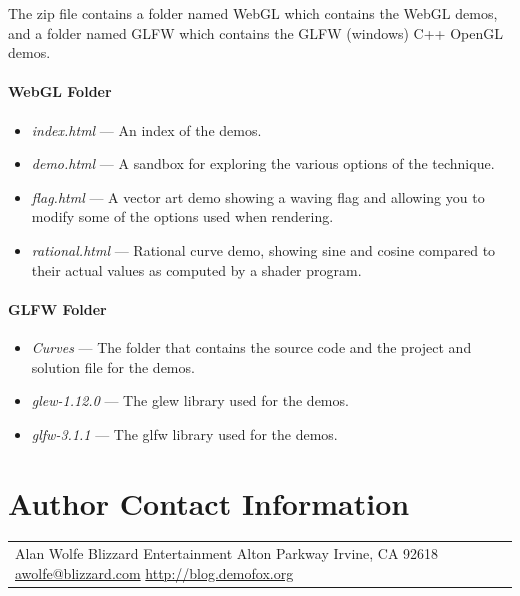 \documentclass{jcgt}
\begin{document}
The zip file contains a folder named WebGL which contains the WebGL demos, and a folder named GLFW which contains the GLFW (windows) C++ OpenGL demos.

\paragraph{\textbf{WebGL Folder}}
\begin{itemize}
  \item \textit{index.html} --- An index of the demos.
  \item \textit{demo.html} --- A sandbox for exploring the various options of the technique.
  \item \textit{flag.html} --- A vector art demo showing a waving flag and allowing you to modify some of the options used when rendering.
  \item \textit{rational.html} --- Rational curve demo, showing sine and cosine compared to their actual values as computed by a shader program.
\end{itemize}

\paragraph{\textbf{GLFW Folder}}
\begin{itemize}
  \item \textit{Curves} --- The folder that contains the source code and the project and solution file for the demos.
  \item \textit{glew-1.12.0} --- The glew library used for the demos.
  \item \textit{glfw-3.1.1} --- The glfw library used for the demos.  
\end{itemize}

\section*{Author Contact Information}

\hspace{-2mm}\begin{tabular}{p{}p{}}
Alan Wolfe \newline
Blizzard Entertainment \newline
16215 Alton Parkway \newline
Irvine, CA 92618 \newline
\href{mailto:awolfe@blizzard.com}{awolfe@blizzard.com}
\href{http://blog.demofox.org}{http://blog.demofox.org}
\end{tabular}


\afterdoc
\end{document}
